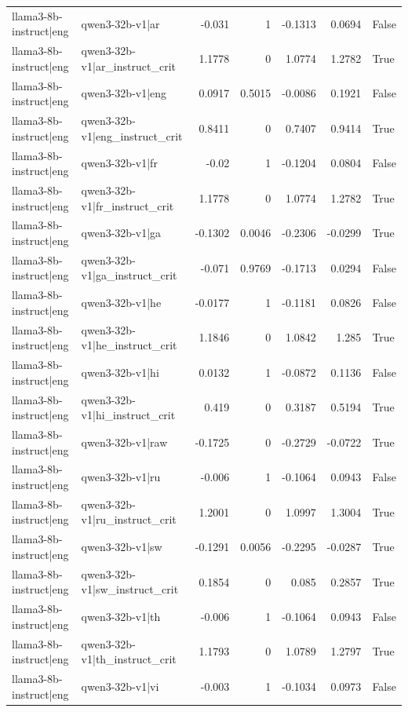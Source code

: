 \begin{table}
\begin{tabular}{l l r r r r l}
llama3-8b-instruct|eng & qwen3-32b-v1|ar & -0.031 & 1 & -0.1313 & 0.0694 & False \\
llama3-8b-instruct|eng & qwen3-32b-v1|ar_instruct_crit & 1.1778 & 0 & 1.0774 & 1.2782 & True \\
llama3-8b-instruct|eng & qwen3-32b-v1|eng & 0.0917 & 0.5015 & -0.0086 & 0.1921 & False \\
llama3-8b-instruct|eng & qwen3-32b-v1|eng_instruct_crit & 0.8411 & 0 & 0.7407 & 0.9414 & True \\
llama3-8b-instruct|eng & qwen3-32b-v1|fr & -0.02 & 1 & -0.1204 & 0.0804 & False \\
llama3-8b-instruct|eng & qwen3-32b-v1|fr_instruct_crit & 1.1778 & 0 & 1.0774 & 1.2782 & True \\
llama3-8b-instruct|eng & qwen3-32b-v1|ga & -0.1302 & 0.0046 & -0.2306 & -0.0299 & True \\
llama3-8b-instruct|eng & qwen3-32b-v1|ga_instruct_crit & -0.071 & 0.9769 & -0.1713 & 0.0294 & False \\
llama3-8b-instruct|eng & qwen3-32b-v1|he & -0.0177 & 1 & -0.1181 & 0.0826 & False \\
llama3-8b-instruct|eng & qwen3-32b-v1|he_instruct_crit & 1.1846 & 0 & 1.0842 & 1.285 & True \\
llama3-8b-instruct|eng & qwen3-32b-v1|hi & 0.0132 & 1 & -0.0872 & 0.1136 & False \\
llama3-8b-instruct|eng & qwen3-32b-v1|hi_instruct_crit & 0.419 & 0 & 0.3187 & 0.5194 & True \\
llama3-8b-instruct|eng & qwen3-32b-v1|raw & -0.1725 & 0 & -0.2729 & -0.0722 & True \\
llama3-8b-instruct|eng & qwen3-32b-v1|ru & -0.006 & 1 & -0.1064 & 0.0943 & False \\
llama3-8b-instruct|eng & qwen3-32b-v1|ru_instruct_crit & 1.2001 & 0 & 1.0997 & 1.3004 & True \\
llama3-8b-instruct|eng & qwen3-32b-v1|sw & -0.1291 & 0.0056 & -0.2295 & -0.0287 & True \\
llama3-8b-instruct|eng & qwen3-32b-v1|sw_instruct_crit & 0.1854 & 0 & 0.085 & 0.2857 & True \\
llama3-8b-instruct|eng & qwen3-32b-v1|th & -0.006 & 1 & -0.1064 & 0.0943 & False \\
llama3-8b-instruct|eng & qwen3-32b-v1|th_instruct_crit & 1.1793 & 0 & 1.0789 & 1.2797 & True \\
llama3-8b-instruct|eng & qwen3-32b-v1|vi & -0.003 & 1 & -0.1034 & 0.0973 & False \\

\end{tabular}
\end{table}
